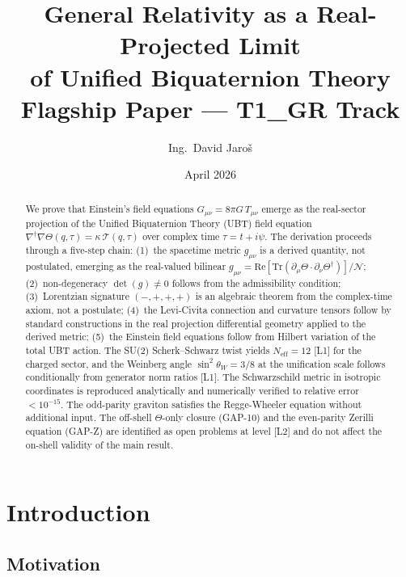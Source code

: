 \documentclass[12pt,a4paper]{article}
\title{\textbf{General Relativity as a Real-Projected Limit\\
       of Unified Biquaternion Theory}\\[8pt]
  \large Flagship Paper — T1\_GR Track}
\author{Ing.\ David Jaroš}
\date{April 2026}
\theoremstyle{definition}
\theoremstyle{remark}
\newcommand{\Tr}{\mathrm{Tr}}
\newcommand{\re}{\mathrm{Re}}
\newcommand{\calN}{\mathcal{N}}
\begin{document}
\maketitle

\begin{abstract}
We prove that Einstein's field equations $G_{\mu\nu} = 8\pi G\,T_{\mu\nu}$
emerge as the real-sector projection of the Unified Biquaternion Theory (UBT)
field equation
$\nabla^\dagger\nabla\Theta(q,\tau) = \kappa\,\mathcal{T}(q,\tau)$
over complex time $\tau = t + i\psi$.
The derivation proceeds through a five-step chain:
(1)~the spacetime metric $g_{\mu\nu}$ is a derived quantity, not postulated,
emerging as the real-valued bilinear
$g_{\mu\nu} = \re[\Tr(\partial_\mu\Theta \cdot \partial_\nu\Theta^\dagger)]/\calN$;
(2)~non-degeneracy $\det(g) \neq 0$ follows from the admissibility condition;
(3)~Lorentzian signature $(-,+,+,+)$ is an algebraic theorem from the
complex-time axiom, not a postulate;
(4)~the Levi-Civita connection and curvature tensors follow by standard constructions in the real projection
differential geometry applied to the derived metric;
(5)~the Einstein field equations follow from Hilbert variation of the total
UBT action.
The SU(2) Scherk--Schwarz twist yields $N_{\mathrm{eff}}=12$ [L1]
for the charged sector, and the Weinberg angle
$\sin^2\theta_W=3/8$ at the unification scale follows conditionally
from generator norm ratios [L1].
The Schwarzschild metric in isotropic coordinates is reproduced analytically
and numerically verified to relative error $< 10^{-15}$.
The odd-parity graviton satisfies the Regge-Wheeler equation without
additional input.
The off-shell $\Theta$-only closure (GAP-10) and the even-parity Zerilli
equation (GAP-Z) are identified as open problems at level [L2] and do not
affect the on-shell validity of the main result.
\end{abstract}

\tableofcontents
\bigskip\bigskip

\section{Introduction}
\label{sec:intro}

\subsection{Motivation}
\end{document}
